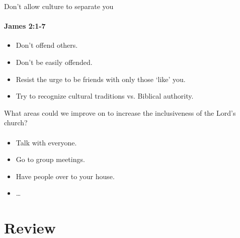 \begin{frame}{Don't allow culture to separate you}
\framesubtitle{James 2:1-7}

\begin{itemize}
	\item Don't offend others.
	\item Don't be easily offended.
	\item Resist the urge to be friends with only those `like' you.
	\item Try to recognize cultural traditions vs. Biblical authority.
\end{itemize}

\end{frame}

\begin{frame}{What areas could we improve on to increase the inclusiveness of the Lord's church?}
\framesubtitle{}

\begin{itemize}
	\item Talk with everyone.
	\item Go to group meetings.
	\item Have people over to your house.
	\item \ldots
\end{itemize}

\end{frame}

\section{Review}

